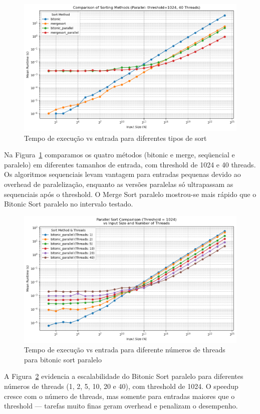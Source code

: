 \documentclass{article}
\begin{document}
\begin{figure}[H]
    \centering
    \includegraphics[width=0.8\linewidth]{images/byInput.png}
    \caption{Tempo de execução vs entrada para diferentes tipos de sort}
    \label{fig:sortsByInput}
\end{figure}

Na Figura~\ref{fig:sortsByInput} comparamos os quatro métodos (bitonic e merge, seqüencial e paralelo) em diferentes tamanhos de entrada, com threshold de 1024 e 40 threads. Os algoritmos sequenciais levam vantagem para entradas pequenas devido ao overhead de paralelização, enquanto as versões paralelas só ultrapassam as sequenciais após o threshold. O Merge Sort paralelo mostrou-se  mais rápido que o Bitonic Sort paralelo no intervalo testado.

\begin{figure}[H]
    \centering
    \includegraphics[width=0.8\linewidth]{images/byInputAndThreads.png}
    \caption{Tempo de execução vs entrada para diferente números de threads para bitonic sort paralelo}
    \label{fig:threadsByInput}
\end{figure}

A Figura~\ref{fig:threadsByInput} evidencia a escalabilidade do Bitonic Sort paralelo para diferentes números de threads (1, 2, 5, 10, 20 e 40), com threshold de 1024. O speedup cresce com o número de threads, mas somente para entradas maiores que o threshold — tarefas muito finas geram overhead e penalizam o desempenho.
\end{document}
